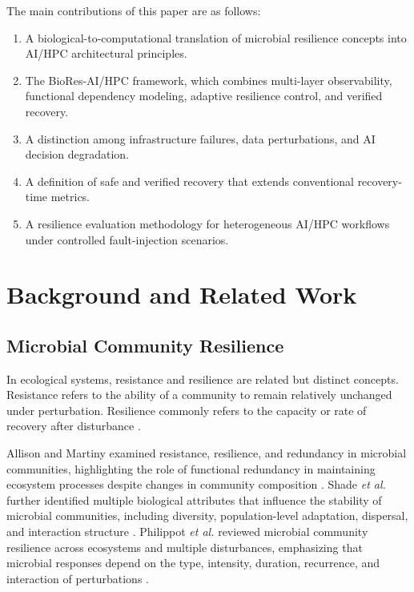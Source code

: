 \documentclass[conference]{IEEEtran}
\begin{document}
The main contributions of this paper are as follows:
\begin{enumerate}
    \item A biological-to-computational translation of microbial resilience concepts into AI/HPC architectural principles.
    \item The BioRes-AI/HPC framework, which combines multi-layer observability, functional dependency modeling, adaptive resilience control, and verified recovery.
    \item A distinction among infrastructure failures, data perturbations, and AI decision degradation.
    \item A definition of safe and verified recovery that extends conventional recovery-time metrics.
    \item A resilience evaluation methodology for heterogeneous AI/HPC workflows under controlled fault-injection scenarios.
\end{enumerate}

\section{Background and Related Work}

\subsection{Microbial Community Resilience}

In ecological systems, resistance and resilience are related but distinct concepts. Resistance refers to the ability of a community to remain relatively unchanged under perturbation. Resilience commonly refers to the capacity or rate of recovery after disturbance \cite{allison2008,shade2012}.

Allison and Martiny examined resistance, resilience, and redundancy in microbial communities, highlighting the role of functional redundancy in maintaining ecosystem processes despite changes in community composition \cite{allison2008}. Shade \emph{et al.} further identified multiple biological attributes that influence the stability of microbial communities, including diversity, population-level adaptation, dispersal, and interaction structure \cite{shade2012}. Philippot \emph{et al.} reviewed microbial community resilience across ecosystems and multiple disturbances, emphasizing that microbial responses depend on the type, intensity, duration, recurrence, and interaction of perturbations \cite{philippot2021}.
\end{document}
